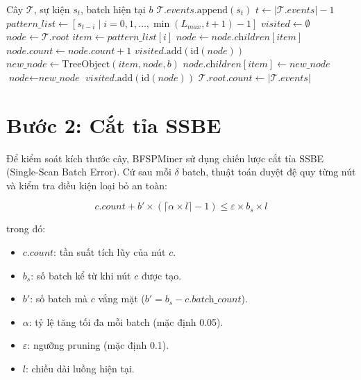 \documentclass[14pt,a4paper,oneside]{extreport}
\begin{document}
\begin{algorithm}[!ht]
\small
\caption{Thêm sự kiện vào cây Inverted $T_0$}
\label{alg:add_event}
\begin{algorithmic}[1]
\REQUIRE Cây $\mathcal{T}$, sự kiện $s_t$, batch hiện tại $b$
\STATE $\mathcal{T}.\textit{events}.\text{append}(s_t)$
\STATE $t \leftarrow |\mathcal{T}.\textit{events}| - 1$
\STATE $\textit{pattern\_list} \leftarrow [s_{t-i} \mid i = 0, 1, \dots, \min(L_{max}, t+1) - 1]$
\STATE $\textit{visited} \leftarrow \emptyset$ 
\STATE $\textit{node} \leftarrow \mathcal{T}.\textit{root}$
    \STATE $\textit{item} \leftarrow \textit{pattern\_list}[i]$
        \STATE $\textit{node} \leftarrow \textit{node}.\textit{children}[\textit{item}]$
            \STATE $\textit{node}.\textit{count} \leftarrow \textit{node}.\textit{count} + 1$
            \STATE $\textit{visited}.\text{add}(\text{id}(\textit{node}))$
        \ENDIF
    \ELSE
        \STATE $\textit{new\_node} \leftarrow \text{TreeObject}(\textit{item}, \textit{node}, b)$
        \STATE $\textit{node}.\textit{children}[\textit{item}] \leftarrow \textit{new\_node}$
        \STATE $\textit{node} \leftarrow \textit{new\_node}$
        \STATE $\textit{visited}.\text{add}(\text{id}(\textit{node}))$
    \ENDIF
\ENDFOR
\STATE $\mathcal{T}.\textit{root}.\textit{count} \leftarrow |\mathcal{T}.\textit{events}|$
\end{algorithmic}
\end{algorithm}
\vspace{-0.5em}

\section{Bước 2: Cắt tỉa SSBE}
\label{sec:ssbe}

Để kiểm soát kích thước cây, BFSPMiner sử dụng chiến lược cắt tỉa SSBE (Single-Scan Batch Error). Cứ sau mỗi $\delta$ batch, thuật toán duyệt đệ quy từng nút và kiểm tra điều kiện loại bỏ an toàn:

\begin{equation}
    c.\textit{count} + b' \times (\lceil \alpha \times l \rceil - 1) \leq \varepsilon \times b_s \times l
\end{equation}

trong đó:
\begin{itemize}
    \item $c.\textit{count}$: tần suất tích lũy của nút $c$.
    \item $b_s$: số batch kể từ khi nút $c$ được tạo.
    \item $b'$: số batch mà $c$ vắng mặt ($b' = b_s - c.\textit{batch\_count}$).
    \item $\alpha$: tỷ lệ tăng tối đa mỗi batch (mặc định 0.05).
    \item $\varepsilon$: ngưỡng pruning (mặc định 0.1).
    \item $l$: chiều dài luồng hiện tại.
\end{itemize}
\end{document}
